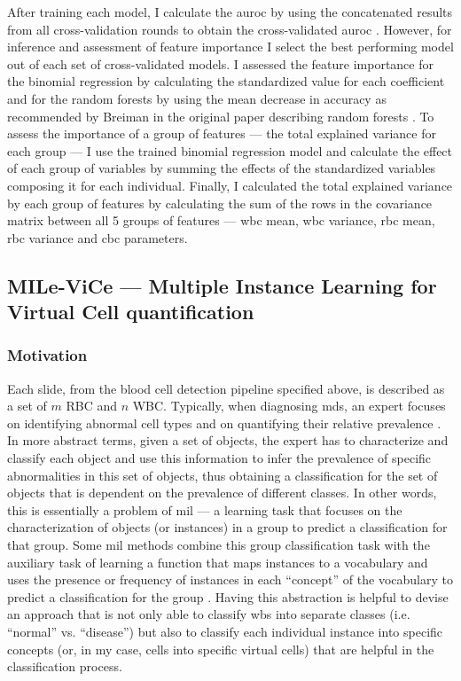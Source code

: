 After training each model, I calculate the \ac{auroc} by using the concatenated results from all cross-validation rounds to obtain the cross-validated \ac{auroc} \cite{Fawcett2006-mo}. However, for inference and assessment of feature importance I select the best performing model out of each set of cross-validated models. I assessed the feature importance for the binomial regression by calculating the standardized value for each coefficient and for the random forests by using the mean decrease in accuracy as recommended by Breiman in the original paper describing random forests \cite{Breiman2001-yz}. To assess the importance of a group of features --- the total explained variance for each group --- I use the trained binomial regression model and calculate the effect of each group of variables by summing the effects of the standardized variables composing it for each individual. Finally, I calculated the total explained variance by each group of features by calculating the sum of the rows in the covariance matrix between all 5 groups of features --- \ac{wbc} mean, \ac{wbc} variance, \ac{rbc} mean, \ac{rbc} variance and \ac{cbc} parameters.

\subsection{MILe-ViCe --- Multiple Instance Learning for Virtual Cell quantification}

\subsubsection{Motivation}

Each slide, from the blood cell detection pipeline specified above, is described as a set of $m$ RBC and $n$ WBC. Typically, when diagnosing \ac{mds}, an expert focuses on identifying abnormal cell types and on quantifying their relative prevalence \cite{Valent2017-uh}. In more abstract terms, given a set of objects, the expert has to characterize and classify each object and use this information to infer the prevalence of specific abnormalities in this set of objects, thus obtaining a classification for the set of objects that is dependent on the prevalence of different classes. In other words, this is essentially a problem of \ac{mil} --- a learning task that focuses on the characterization of objects (or instances) in a group to predict a classification for that group. Some \ac{mil} methods combine this group classification task with the auxiliary task of learning a function that maps instances to a vocabulary and uses the presence or frequency of instances in each “concept” of the vocabulary to predict a classification for the group \cite{Amores2013-ym}. Having this abstraction is helpful to devise an approach that is not only able to classify \ac{wbs} into separate classes (i.e. “normal” vs. “disease”) but also to classify each individual instance into specific concepts (or, in my case, cells into specific virtual cells) that are helpful in the classification process. 

